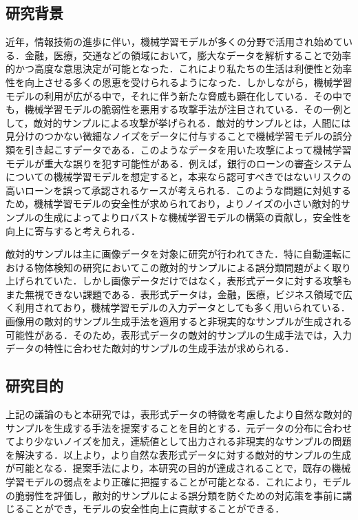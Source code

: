 \subsection{研究背景}
近年，情報技術の進歩に伴い，機械学習モデルが多くの分野で活用され始めている．金融，医療，交通などの領域において，膨大なデータを解析することで効率的かつ高度な意思決定が可能となった．これにより私たちの生活は利便性と効率性を向上させる多くの恩恵を受けられるようになった．しかしながら，機械学習モデルの利用が広がる中で，それに伴う新たな脅威も顕在化している．その中でも，機械学習モデルの脆弱性を悪用する攻撃手法が注目されている．その一例として，敵対的サンプルによる攻撃が挙げられる．敵対的サンプルとは，人間には見分けのつかない微細なノイズをデータに付与することで機械学習モデルの誤分類を引き起こすデータである．このようなデータを用いた攻撃によって機械学習モデルが重大な誤りを犯す可能性がある．例えば，銀行のローンの審査システムについての機械学習モデルを想定すると，本来なら認可すべきではないリスクの高いローンを誤って承認されるケースが考えられる．このような問題に対処するため，機械学習モデルの安全性が求められており，よりノイズの小さい敵対的サンプルの生成によってよりロバストな機械学習モデルの構築の貢献し，安全性を向上に寄与すると考えられる．

敵対的サンプルは主に画像データを対象に研究が行われてきた．特に自動運転における物体検知の研究においてこの敵対的サンプルによる誤分類問題がよく取り上げられていた．しかし画像データだけではなく，表形式データに対する攻撃もまた無視できない課題である．表形式データは，金融，医療，ビジネス領域で広く利用されており，機械学習モデルの入力データとしても多く用いられている．画像用の敵対的サンプル生成手法を適用すると非現実的なサンプルが生成される可能性がある．そのため，表形式データの敵対的サンプルの生成手法では，入力データの特性に合わせた敵対的サンプルの生成手法が求められる．

\subsection{研究目的}
上記の議論のもと本研究では，表形式データの特徴を考慮したより自然な敵対的サンプルを生成する手法を提案することを目的とする．元データの分布に合わせてより少ないノイズを加え，連続値として出力される非現実的なサンプルの問題を解決する．以上より，より自然な表形式データに対する敵対的サンプルの生成が可能となる．提案手法により，本研究の目的が達成されることで，既存の機械学習モデルの弱点をより正確に把握することが可能となる．これにより，モデルの脆弱性を評価し，敵対的サンプルによる誤分類を防ぐための対応策を事前に講じることができ，モデルの安全性向上に貢献することができる．